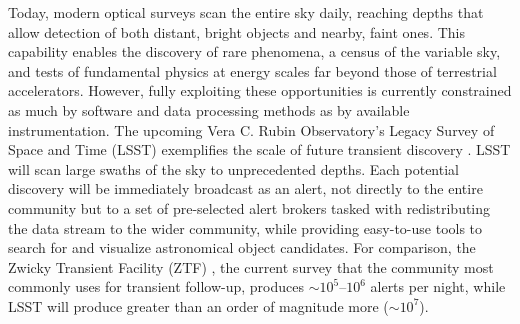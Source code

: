 \documentclass[twocolumn]{aastex631}
\begin{document}
Today, modern optical surveys scan the entire sky daily, reaching depths that allow detection of both distant, bright objects and nearby, faint ones. This capability enables the discovery of rare phenomena, a census of the variable sky, and tests of fundamental physics at energy scales far beyond those of terrestrial accelerators. However, fully exploiting these opportunities is currently constrained as much by software and data processing methods as by available instrumentation.
The upcoming Vera C. Rubin Observatory's Legacy Survey of Space and Time (LSST) exemplifies the scale of future transient discovery \citep{Ivezic2019}. LSST will scan large swaths of the sky to unprecedented depths. Each potential discovery will be immediately broadcast as an alert, not directly to the entire community but to a set of pre-selected alert brokers tasked with redistributing the data stream to the wider community, while providing easy-to-use tools to search for and visualize astronomical object candidates.
For comparison, the Zwicky Transient Facility (ZTF) \citep{Bellm:19:ZTFScheduler,Graham2018,DeSm2018,Masci2019}, the current survey that the community most commonly uses for transient follow-up, produces $\sim 10^5$--$10^6$ alerts per night, while LSST will produce greater than an order of magnitude more ($\sim 10^7$).
\end{document}
